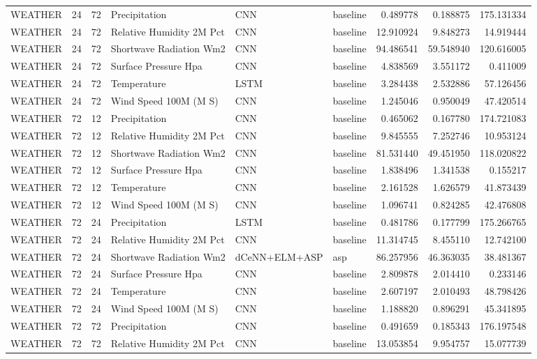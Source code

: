 \begin{table}
\begin{tabular}{lrrlllrrr}
WEATHER & 24 & 72 & Precipitation & CNN & baseline & 0.489778 & 0.188875 & 175.131334 \\
WEATHER & 24 & 72 & Relative Humidity 2M Pct & CNN & baseline & 12.910924 & 9.848273 & 14.919444 \\
WEATHER & 24 & 72 & Shortwave Radiation Wm2 & CNN & baseline & 94.486541 & 59.548940 & 120.616005 \\
WEATHER & 24 & 72 & Surface Pressure Hpa & CNN & baseline & 4.838569 & 3.551172 & 0.411009 \\
WEATHER & 24 & 72 & Temperature & LSTM & baseline & 3.284438 & 2.532886 & 57.126456 \\
WEATHER & 24 & 72 & Wind Speed 100M (M S) & CNN & baseline & 1.245046 & 0.950049 & 47.420514 \\
WEATHER & 72 & 12 & Precipitation & CNN & baseline & 0.465062 & 0.167780 & 174.721083 \\
WEATHER & 72 & 12 & Relative Humidity 2M Pct & CNN & baseline & 9.845555 & 7.252746 & 10.953124 \\
WEATHER & 72 & 12 & Shortwave Radiation Wm2 & CNN & baseline & 81.531440 & 49.451950 & 118.020822 \\
WEATHER & 72 & 12 & Surface Pressure Hpa & CNN & baseline & 1.838496 & 1.341538 & 0.155217 \\
WEATHER & 72 & 12 & Temperature & CNN & baseline & 2.161528 & 1.626579 & 41.873439 \\
WEATHER & 72 & 12 & Wind Speed 100M (M S) & CNN & baseline & 1.096741 & 0.824285 & 42.476808 \\
WEATHER & 72 & 24 & Precipitation & LSTM & baseline & 0.481786 & 0.177799 & 175.266765 \\
WEATHER & 72 & 24 & Relative Humidity 2M Pct & CNN & baseline & 11.314745 & 8.455110 & 12.742100 \\
WEATHER & 72 & 24 & Shortwave Radiation Wm2 & dCeNN+ELM+ASP & asp & 86.257956 & 46.363035 & 38.481367 \\
WEATHER & 72 & 24 & Surface Pressure Hpa & CNN & baseline & 2.809878 & 2.014410 & 0.233146 \\
WEATHER & 72 & 24 & Temperature & CNN & baseline & 2.607197 & 2.010493 & 48.798426 \\
WEATHER & 72 & 24 & Wind Speed 100M (M S) & CNN & baseline & 1.188820 & 0.896291 & 45.341895 \\
WEATHER & 72 & 72 & Precipitation & CNN & baseline & 0.491659 & 0.185343 & 176.197548 \\
WEATHER & 72 & 72 & Relative Humidity 2M Pct & CNN & baseline & 13.053854 & 9.954757 & 15.077739 \\

\end{tabular}
\end{table}
